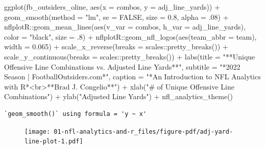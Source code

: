 \documentclass[
  letterpaper,
]{krantz}
\newenvironment{Shaded}{\begin{snugshade}}{\end{snugshade}}
\newcommand{\AttributeTok}[1]{\textcolor[rgb]{0.40,0.45,0.13}{#1}}
\newcommand{\ConstantTok}[1]{\textcolor[rgb]{0.56,0.35,0.01}{#1}}
\newcommand{\DecValTok}[1]{\textcolor[rgb]{0.68,0.00,0.00}{#1}}
\newcommand{\FloatTok}[1]{\textcolor[rgb]{0.68,0.00,0.00}{#1}}
\newcommand{\FunctionTok}[1]{\textcolor[rgb]{0.28,0.35,0.67}{#1}}
\newcommand{\NormalTok}[1]{\textcolor[rgb]{0.00,0.23,0.31}{#1}}
\newcommand{\SpecialCharTok}[1]{\textcolor[rgb]{0.37,0.37,0.37}{#1}}
\newcommand{\StringTok}[1]{\textcolor[rgb]{0.13,0.47,0.30}{#1}}
\begin{document}
\begin{Shaded}
\begin{Highlighting}[]
\FunctionTok{ggplot}\NormalTok{(fb\_outsiders\_oline, }\FunctionTok{aes}\NormalTok{(}\AttributeTok{x =}\NormalTok{ combos, }\AttributeTok{y =}\NormalTok{ adj\_line\_yards)) }\SpecialCharTok{+}
  \FunctionTok{geom\_smooth}\NormalTok{(}\AttributeTok{method =} \StringTok{"lm"}\NormalTok{, }\AttributeTok{se =} \ConstantTok{FALSE}\NormalTok{, }\AttributeTok{size =} \FloatTok{0.8}\NormalTok{, }\AttributeTok{alpha =}\NormalTok{ .}\DecValTok{08}\NormalTok{) }\SpecialCharTok{+}
\NormalTok{  nflplotR}\SpecialCharTok{::}\FunctionTok{geom\_mean\_lines}\NormalTok{(}\FunctionTok{aes}\NormalTok{(}\AttributeTok{v\_var =}\NormalTok{ combos, }\AttributeTok{h\_var =}\NormalTok{ adj\_line\_yards),}
                            \AttributeTok{color =} \StringTok{"black"}\NormalTok{, }\AttributeTok{size =}\NormalTok{ .}\DecValTok{8}\NormalTok{) }\SpecialCharTok{+}
\NormalTok{  nflplotR}\SpecialCharTok{::}\FunctionTok{geom\_nfl\_logos}\NormalTok{(}\FunctionTok{aes}\NormalTok{(}\AttributeTok{team\_abbr =}\NormalTok{ team), }\AttributeTok{width =} \FloatTok{0.065}\NormalTok{) }\SpecialCharTok{+}
  \FunctionTok{scale\_x\_reverse}\NormalTok{(}\AttributeTok{breaks =}\NormalTok{ scales}\SpecialCharTok{::}\FunctionTok{pretty\_breaks}\NormalTok{()) }\SpecialCharTok{+}
  \FunctionTok{scale\_y\_continuous}\NormalTok{(}\AttributeTok{breaks =}\NormalTok{ scales}\SpecialCharTok{::}\FunctionTok{pretty\_breaks}\NormalTok{()) }\SpecialCharTok{+}
  \FunctionTok{labs}\NormalTok{(}\AttributeTok{title =} \StringTok{"**Unique Offensive Line Combinations vs. Adjusted Line Yards**"}\NormalTok{,}
       \AttributeTok{subtitle =} \StringTok{"*2022 Season  |  FootballOutsiders.com*"}\NormalTok{,}
       \AttributeTok{caption =} \StringTok{"*An Introduction to NFL Analytics with R*\textless{}br\textgreater{}**Brad J. Congelio**"}\NormalTok{) }\SpecialCharTok{+}
  \FunctionTok{xlab}\NormalTok{(}\StringTok{"\# of Unique Offensive Line Combinations"}\NormalTok{) }\SpecialCharTok{+}
  \FunctionTok{ylab}\NormalTok{(}\StringTok{"Adjusted Line Yards"}\NormalTok{) }\SpecialCharTok{+}
  \FunctionTok{nfl\_analytics\_theme}\NormalTok{()}
\end{Highlighting}
\end{Shaded}

\begin{verbatim}
`geom_smooth()` using formula = 'y ~ x'
\end{verbatim}

\begin{figure}[H]

{\centering \texttt{[image: 01-nfl-analytics-and-r\_files/figure-pdf/adj-yard-line-plot-1.pdf]}

}

\end{figure}
\end{document}
